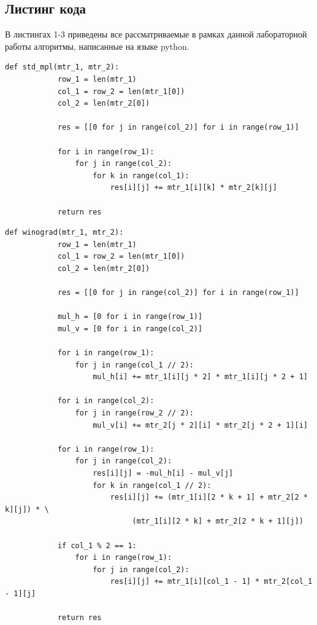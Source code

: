 \documentclass[a4paper, 14pt]{article}
\begin{document}
        \subsection{Листинг кода}
        В листингах 1-3 приведены все рассматриваемые в рамках данной лабораторной работы алгоритмы, написанные на языке python.
        \newpage
		\begin{lstlisting}[label=some-code,caption=Стандартный алгоритм]
		def std_mpl(mtr_1, mtr_2):
    		row_1 = len(mtr_1)
    		col_1 = row_2 = len(mtr_1[0])
    		col_2 = len(mtr_2[0])

    		res = [[0 for j in range(col_2)] for i in range(row_1)]

    		for i in range(row_1):
        		for j in range(col_2):
            		for k in range(col_1):
                		res[i][j] += mtr_1[i][k] * mtr_2[k][j]

    		return res
		\end{lstlisting}
		\begin{lstlisting}[label=some-code,caption=Алгоритм Винограда]
		def winograd(mtr_1, mtr_2):
    		row_1 = len(mtr_1)
    		col_1 = row_2 = len(mtr_1[0])
    		col_2 = len(mtr_2[0])

    		res = [[0 for j in range(col_2)] for i in range(row_1)]

    		mul_h = [0 for i in range(row_1)]
    		mul_v = [0 for i in range(col_2)]

    		for i in range(row_1):
        		for j in range(col_1 // 2):
            		mul_h[i] += mtr_1[i][j * 2] * mtr_1[i][j * 2 + 1]

    		for i in range(col_2):
        		for j in range(row_2 // 2):
            		mul_v[i] += mtr_2[j * 2][i] * mtr_2[j * 2 + 1][i]

    		for i in range(row_1):
        		for j in range(col_2):
            		res[i][j] = -mul_h[i] - mul_v[j]
            		for k in range(col_1 // 2):
                		res[i][j] += (mtr_1[i][2 * k + 1] + mtr_2[2 * k][j]) * \
                             (mtr_1[i][2 * k] + mtr_2[2 * k + 1][j])

    		if col_1 % 2 == 1:
        		for i in range(row_1):
            		for j in range(col_2):
                		res[i][j] += mtr_1[i][col_1 - 1] * mtr_2[col_1 - 1][j]

    		return res
		\end{lstlisting}
		\newpage
\end{document}
